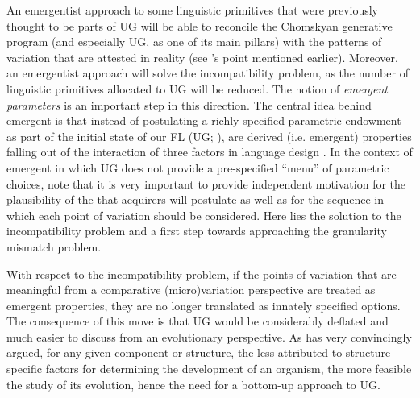 \documentclass[output=paper]{langsci/langscibook}
\begin{document}
An emergentist approach to some linguistic primitives that were previously
thought to be parts of \gls{UG} will be able to reconcile
the Chomskyan generative program (and especially \gls{UG}, as one of its main
pillars) with the patterns of variation that are attested in reality (see
\citeauthor{Yang2004}’s \citeyear{Yang2004} point mentioned earlier). Moreover,
an emergentist approach will solve the incompatibility problem, as the number
of linguistic primitives allocated to \gls{UG} will be reduced. The notion of
\emph{emergent parameters}
\parencite{RobHol2010,Roberts2012,BibRobShee2014,BibRob2017} is an important
step in this direction. The central idea behind emergent  is
that instead of postulating a richly specified parametric endowment as part of
the initial state of our \gls{FL} (UG; \citealt{Chomsky:81}), 
are derived (i.e. emergent) properties falling out of the interaction of
 three factors in language design
\citep{BibHolRobShee2014}. In the context of emergent  in which
\gls{UG} does not provide a pre-specified \enquote{menu} of parametric choices,
\citet{BibRobShee2014} note that it is very important to provide independent
motivation for the plausibility of the  that acquirers will
postulate as well as for the sequence in which each point of variation should
be considered. Here lies the solution to the incompatibility problem and a
first step towards approaching the granularity mismatch problem.

With respect to the incompatibility problem, if the points of variation that
are meaningful from a comparative (micro)variation perspective are treated as
emergent properties, they are no longer translated as innately specified
options. The consequence of this move is that \gls{UG} would be considerably
deflated and much easier to discuss from an evolutionary perspective. As
\citet{Chomsky2007} has very convincingly argued, for any given component or
structure, the less attributed to structure-specific factors for determining
the development of an organism, the more feasible the study of its evolution,
hence the need for a bottom-up approach to \gls{UG}.
\end{document}
